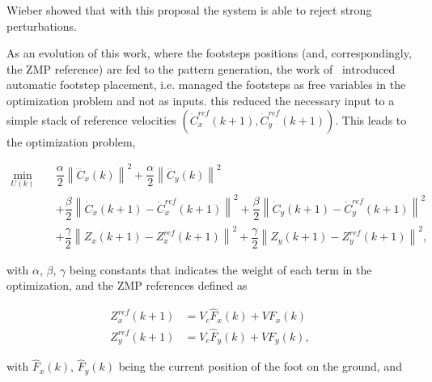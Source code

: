 Wieber showed that with this proposal the system is able to reject strong perturbations.

As an evolution of this work, where the footsteps positions (and, correspondingly, the ZMP reference) are fed to the pattern generation, the work of~\citep{HerdtAR2010} introduced automatic footstep placement, i.e. managed the footsteps as free variables in the optimization problem and not as inputs. this reduced the necessary input to a simple stack of reference velocities $(\dot{C}_{x}^{ref}(k+1),\dot{C}_{y}^{ref}(k+1))$. This leads to the optimization problem,

\begin{eqnarray}
\nonumber
 \underset{U(k)}{\min} \; && \dfrac{\alpha}{2} \left\| \dddot{C}_x(k) \right\|^2 + \dfrac{\alpha}{2} \left\| \dddot{C}_y(k) \right\|^2 \\
&& + \dfrac{\beta}{2} \left\| \dot{C}_{x}(k+1) - \dot{C}_{x}^{ref}(k+1) \right\|^2 + \dfrac{\beta}{2} \left\| \dot{C}_{y}(k+1) - \dot{C}_{y}^{ref}(k+1) \right\|^2  \nonumber \\
&& + \dfrac{\gamma}{2} \left\| Z_x(k+1) - Z_x^{ref}(k+1) \right\|^2 + \dfrac{\gamma}{2} \left\| Z_y(k+1) - Z_y^{ref}(k+1) \right\|^2,
\label{Eq:MinJerk}
\end{eqnarray}

with $\alpha$, $\beta$, $\gamma$ being constants that indicates the weight of each term in the optimization, and the ZMP references defined as

\begin{eqnarray}
\label{Eq:ZMPReference}
  Z_x^{ref}(k+1) & = V_c \hat{F}_x(k) + V F_x(k) \nonumber \\
  Z_y^{ref}(k+1) & = V_c \hat{F}_y(k) + V F_y(k),
\end{eqnarray}

with $\hat{F}_x(k)$, $\hat{F}_y(k)$ being the current position of the foot on
the ground, and

